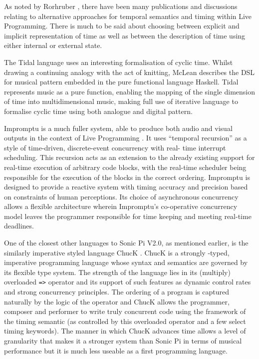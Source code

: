 \documentclass[11pt]{scrartcl}
\begin{document}
As noted by Rorhruber \cite{BMNR14}, there have been many publications and 
discussions relating to alternative approaches for temporal semantics and 
timing within Live Programming. There is much to be said about choosing 
between explicit and implicit representation of time as well as between the 
description of time using either internal or external state.

The Tidal language \cite{McL13} uses an interesting formalisation of cyclic 
time. Whilst drawing a continuing analogy with the act of knitting, McLean 
describes the DSL for musical pattern embedded in the pure functional language 
Haskell. Tidal represents music as a pure function, enabling the mapping of 
the single dimension of time into multidimensional music, making full use of 
iterative language to formalise cyclic time using both analogue and digital 
pattern.

Impromptu is a much fuller system, able to produce both audio and visual 
outputs in the context of Live Programming \cite{SG10}. It uses ``temporal 
recursion'' as a style of time-driven, discrete-event concurrency with real-
time interrupt scheduling. This recursion acts as an extension to the already 
existing support for real-time execution of arbitrary code blocks, with the 
real-time scheduler being responsible for the execution of the blocks in the 
correct ordering. Impromptu is designed to provide a reactive system with 
timing accuracy and precision based on constraints of human perceptions. Its 
choice of asynchronous concurrency allows a flexible architecture wherein 
Impromptu's co-operative concurrency model leaves the programmer responsible 
for time keeping and meeting real-time deadlines.

One of the closest other languages to Sonic Pi V2.0, as mentioned earlier, is 
the similarly imperative styled language ChucK \cite{WC03}. ChucK is a strongly
-typed, imperative programming language whose syntax and semantics are 
governed by its flexible type system. The strength of the language lies in its 
(multiply) overloaded \texttt{=>} operator and its support of such features as 
dynamic control rates and strong concurrency principles. The ordering of a 
program is captured naturally by the logic of the operator and ChucK allows 
the programmer, composer and performer to write truly concurrent code using 
the framework of the timing semantic (as controlled by this overloaded 
operator and a few select timing keywords). The manner in which ChucK advances 
time allows a level of granularity that makes it a stronger system than Sonic 
Pi in terms of musical performance but it is much less useable as a first 
programming language.
\end{document}
